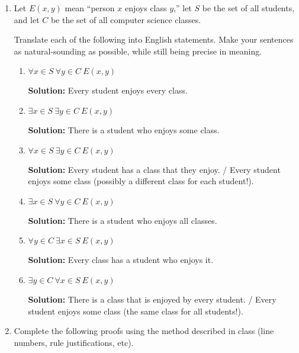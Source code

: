 \documentclass[12pt, letterpaper]{report}
\newcommand{\sol}{\textbf{Solution: }}
\begin{document}
\begin{enumerate}
\sol B, D, E, F
               
               
               \newpage
        \item Let $E(x,y)$ mean ``person $x$ enjoys class $y$,'' let $S$ be the set of
        all students, and let $C$ be the set of all computer science classes.
        
        Translate each of the following into English statements.  Make your sentences as natural-sounding
        as possible, while still being precise in meaning.
        
         \begin{enumerate}
                \item $\forall x \in S \  \forall y \in C \  E(x, y)$
                
                \sol Every student enjoys every class.
                \item $\exists x \in S \  \exists y \in C \  E(x, y)$
                
                \sol There is a student who enjoys some class.
                \item $\forall x \in S \  \exists y \in C \  E(x, y)$
                
                \sol Every student has a class that they enjoy. / Every student enjoys some class (possibly a different class for each student!).
                \item $\exists x \in S \  \forall y \in C \  E(x, y)$
                
                \sol There is a student who enjoys all classes.
                \item $\forall y \in C \  \exists x \in S \  E(x, y)$
                
                \sol Every class has a student who enjoys it.
                \item $\exists y \in C \  \forall x \in S \  E(x, y)$
                
                \sol There is a class that is enjoyed by every student.  /  Every student enjoys some class (the same class for all students!).
                
        \end{enumerate}


\item Complete the following proofs using the method described in class (line numbers, 
rule justifications, etc).

\begin{enumerate}


\end{enumerate}
\end{enumerate}
\end{document}
